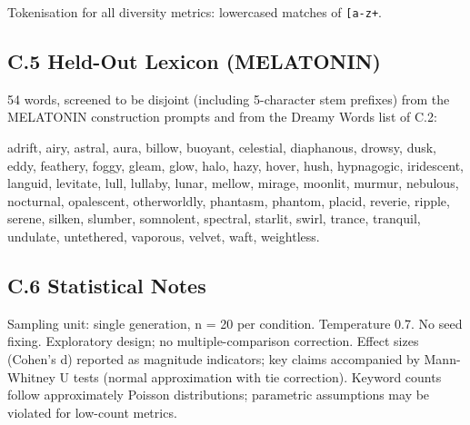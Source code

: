 \documentclass[11pt,a4paper]{article}
\begin{document}
Tokenisation for all diversity metrics: lowercased matches of \texttt{{[}a-z\textquotesingle{}{]}+}.

\subsection*{C.5 Held-Out Lexicon (MELATONIN)}

54 words, screened to be disjoint (including 5-character stem prefixes) from the MELATONIN construction prompts and from the Dreamy Words list of C.2:

adrift, airy, astral, aura, billow, buoyant, celestial, diaphanous, drowsy, dusk, eddy, feathery, foggy, gleam, glow, halo, hazy, hover, hush, hypnagogic, iridescent, languid, levitate, lull, lullaby, lunar, mellow, mirage, moonlit, murmur, nebulous, nocturnal, opalescent, otherworldly, phantasm, phantom, placid, reverie, ripple, serene, silken, slumber, somnolent, spectral, starlit, swirl, trance, tranquil, undulate, untethered, vaporous, velvet, waft, weightless.

\subsection*{C.6 Statistical Notes}

Sampling unit: single generation, n = 20 per condition. Temperature 0.7. No seed fixing. Exploratory design; no multiple-comparison correction. Effect sizes (Cohen's d) reported as magnitude indicators; key claims accompanied by Mann-Whitney U tests (normal approximation with tie correction). Keyword counts follow approximately Poisson distributions; parametric assumptions may be violated for low-count metrics.
\end{document}
